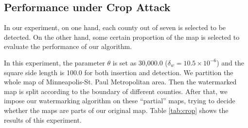 \subsection{Performance under Crop Attack}


In our experiment, on one hand, each county out of seven is selected to be 
detected. On the other hand, some certain proportion of the map is selected 
to evaluate the performance of our algorithm. 

In this experiment, the parameter $\theta $ is set as 30,000.0 
($\delta_w=10.5\times 10^{ -6 }$) and the square side 
length is 100.0 for both insertion and detection. We partition the whole map 
of Minneapolis-St. Paul Metropolitan area. Then the watermarked map is split 
according to the boundary of different counties. After that, we impose our 
watermarking algorithm on these ``partial'' maps, trying to decide whether the 
maps are parts of our original map. Table \ref{tab:crop} shows the results of 
this experiment. 

